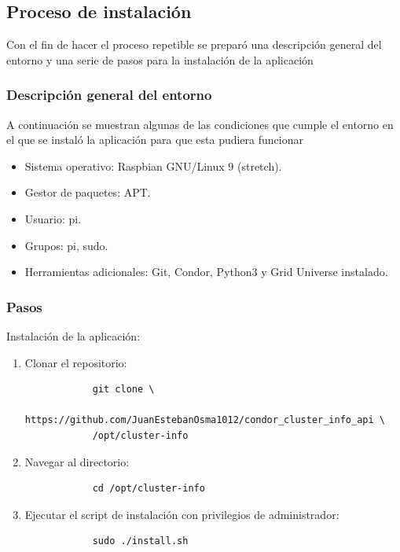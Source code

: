\subsection{Proceso de instalación}
\noindent

Con el fin de hacer el proceso repetible se preparó una descripción general del entorno y una serie de pasos para la instalación de la aplicación

\subsubsection{Descripción general del entorno}
\noindent
A continuación se muestran algunas de las condiciones que cumple el entorno en el que se instaló la aplicación para que esta pudiera funcionar

\begin{itemize}
	\item Sistema operativo: Raspbian GNU/Linux 9 (stretch).
	\item Gestor de paquetes: APT.
	\item Usuario: pi.
	\item Grupos: pi, sudo.
	\item Herramientas adicionales: Git, Condor, Python3 y Grid Universe instalado.
\end{itemize}

\subsubsection{Pasos}
\noindent

Instalación de la aplicación:

\begin{enumerate}
	\item Clonar el repositorio:
	      \begin{verbatim}
			git clone \
			https://github.com/JuanEstebanOsma1012/condor_cluster_info_api \
			/opt/cluster-info
		\end{verbatim}
	
	\item Navegar al directorio:
	      \begin{verbatim}
			cd /opt/cluster-info
		\end{verbatim}
	
	\item Ejecutar el script de instalación con privilegios de administrador:
	      \begin{verbatim}
			sudo ./install.sh
		\end{verbatim}
\end{enumerate}


